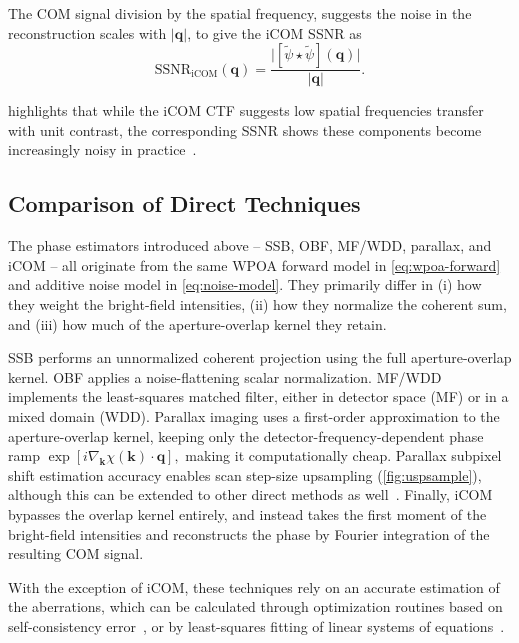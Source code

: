 \documentclass[pdflatex,sn-aps,iicol]{sn-jnl}%
\begin{document}
The COM signal division by the spatial frequency, suggests the noise in the reconstruction scales with $\lvert\boldsymbol{q}\rvert$, to give the iCOM SSNR as~\cite{Varnavides_2025_ssnr}
\begin{equation}
\mathrm{SSNR}_{\text{iCOM}}(\boldsymbol{q})
=
\frac{\lvert [\tilde{\psi}\star\tilde{\psi}](\boldsymbol{q}) \rvert}
{\lvert \boldsymbol{q} \rvert}.
\label{eq:icom-ssnr}
\end{equation}

 highlights that while the iCOM CTF suggests low spatial frequencies transfer with unit contrast, the corresponding SSNR shows these components become increasingly noisy in practice~\cite{Varnavides_2023,Yu_2025,Varnavides_2025_ssnr}.

\subsection{Comparison of Direct Techniques}

The phase estimators introduced above -- SSB, OBF, MF/WDD, parallax, and iCOM -- all originate from the same WPOA forward model in \cref{eq:wpoa-forward} and additive noise model in \cref{eq:noise-model}.
They primarily differ in (i) how they weight the bright-field intensities, (ii) how they normalize the coherent sum, and (iii) how much of the aperture-overlap kernel they retain.

SSB performs an unnormalized coherent projection using the full aperture-overlap kernel.
OBF applies a noise-flattening scalar normalization.
MF/WDD implements the least-squares matched filter, either in detector space (MF) or in a mixed domain (WDD).
Parallax imaging uses a first-order approximation to the aperture-overlap kernel, keeping only the detector-frequency-dependent phase ramp
\(
\exp\!\left[i \nabla_{\boldsymbol{k}}\chi(\boldsymbol{k}) \cdot \boldsymbol{q}\right],
\)
making it computationally cheap.
Parallax subpixel shift estimation accuracy enables scan step-size upsampling (\cref{fig:uspsample}), although this can be extended to other direct methods as well~\cite{Varnavides_2025}.
Finally, iCOM bypasses the overlap kernel entirely, and instead takes the first moment of the bright-field intensities and reconstructs the phase by Fourier integration of the resulting COM signal.

With the exception of iCOM, these techniques rely on an accurate estimation of the aberrations, which can be calculated through optimization routines based on self-consistency error~\cite{Varnavides_2025}, or by least-squares fitting of linear systems of equations~\cite{Varnavides_2023,Yu_2025}.
\end{document}

